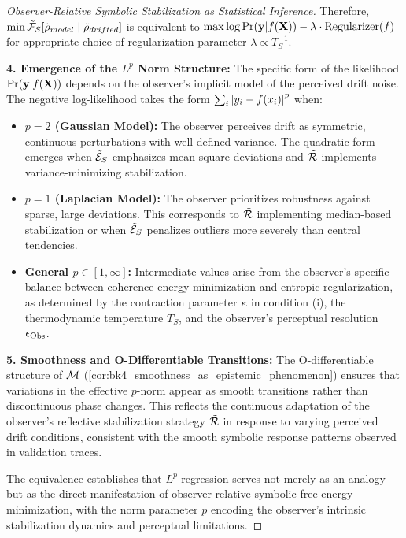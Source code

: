 \begin{proof}[Observer-Relative Symbolic Stabilization as Statistical Inference]
Therefore, $\min \tilde{\mathcal{F}}_S[\tilde{\rho}_{model} \mid \tilde{\rho}_{drifted}]$ is equivalent to $\max \log \mathrm{Pr}(\mathbf{y} | f(\mathbf{X})) - \lambda \cdot \text{Regularizer}(f)$ for appropriate choice of regularization parameter $\lambda \propto T_S^{-1}$.

\textbf{4. Emergence of the $L^p$ Norm Structure:} The specific form of the likelihood $\mathrm{Pr}(\mathbf{y} | f(\mathbf{X}))$ depends on the observer's implicit model of the perceived drift noise. The negative log-likelihood takes the form $\sum_i \left|y_i - f(x_i)\right|^p$ when:
\begin{itemize}
    \item \textbf{$p=2$ (Gaussian Model):} The observer perceives drift as symmetric, continuous perturbations with well-defined variance. The quadratic form emerges when $\tilde{\mathcal{E}}_S$ emphasizes mean-square deviations and $\tilde{\mathcal{R}}$ implements variance-minimizing stabilization.
    \item \textbf{$p=1$ (Laplacian Model):} The observer prioritizes robustness against sparse, large deviations. This corresponds to $\tilde{\mathcal{R}}$ implementing median-based stabilization or when $\tilde{\mathcal{E}}_S$ penalizes outliers more severely than central tendencies.
    \item \textbf{General $p \in [1,\infty]$:} Intermediate values arise from the observer's specific balance between coherence energy minimization and entropic regularization, as determined by the contraction parameter $\kappa$ in condition (i), the thermodynamic temperature $T_S$, and the observer's perceptual resolution $\epsilon_{\mathrm{Obs}}$.
\end{itemize}

\textbf{5. Smoothness and O-Differentiable Transitions:} The O-differentiable structure of $\tilde{\mathcal{M}}$ (\ref{cor:bk4_smoothness_as_epistemic_phenomenon}) ensures that variations in the effective $p$-norm appear as smooth transitions rather than discontinuous phase changes. This reflects the continuous adaptation of the observer's reflective stabilization strategy $\tilde{\mathcal{R}}$ in response to varying perceived drift conditions, consistent with the smooth symbolic response patterns observed in validation traces.

The equivalence establishes that $L^p$ regression serves not merely as an analogy but as the direct manifestation of observer-relative symbolic free energy minimization, with the norm parameter $p$ encoding the observer's intrinsic stabilization dynamics and perceptual limitations.
\end{proof}

